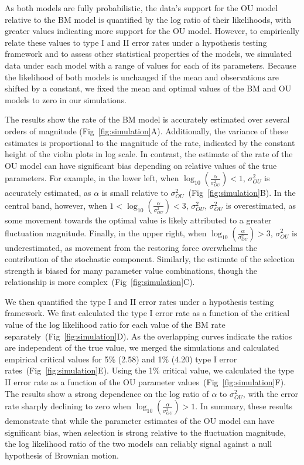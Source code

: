 As both models are fully probabilistic, the data's support for the OU model relative to the BM model is quantified by the log ratio of their likelihoods, with greater values indicating more support for the OU model. However, to empirically relate these values to type I and II error rates under a hypothesis testing framework and to assess other statistical properties of the models, we simulated data under each model with a range of values for each of its parameters. Because the likelihood of both models is unchanged if the mean and observations are shifted by a constant, we fixed the mean and optimal values of the BM and OU models to zero in our simulations.

The results show the rate of the BM model is accurately estimated over several orders of magnitude (Fig~\ref{fig:simulation}A). Additionally, the variance of these estimates is proportional to the magnitude of the rate, indicated by the constant height of the violin plots in log scale. In contrast, the estimate of the rate of the OU model can have significant bias depending on relative values of the true parameters. For example, in the lower left, when $\log_{10}(\frac{\alpha}{\sigma^2_{OU}}) < 1$, $\sigma^2_{OU}$ is accurately estimated, as $\alpha$ is small relative to $\sigma^2_{OU}$~(Fig~\ref{fig:simulation}B). In the central band, however, when $1 < \log_{10}(\frac{\alpha}{\sigma^2_{OU}}) < 3$, $\sigma^2_{OU}$, $\sigma^2_{OU}$ is overestimated, as some movement towards the optimal value is likely attributed to a greater fluctuation magnitude. Finally, in the upper right, when $\log_{10}(\frac{\alpha}{\sigma^2_{OU}}) > 3$, $\sigma^2_{OU}$ is underestimated, as movement from the restoring force overwhelms the contribution of the stochastic component. Similarly, the estimate of the selection strength is biased for many parameter value combinations, though the relationship is more complex~(Fig~\ref{fig:simulation}C).

We then quantified the type I and II error rates under a hypothesis testing framework. We first calculated the type I error rate as a function of the critical value of the log likelihood ratio for each value of the BM rate separately~(Fig~\ref{fig:simulation}D). As the overlapping curves indicate the ratios are independent of the true value, we merged the simulations and calculated empirical critical values for 5\% (2.58) and 1\% (4.20) type I error rates~(Fig~\ref{fig:simulation}E). Using the 1\% critical value, we calculated the type II error rate as a function of the OU parameter values~(Fig~\ref{fig:simulation}F). The results show a strong dependence on the log ratio of $\alpha$ to $\sigma^2_{OU}$, with the error rate sharply declining to zero when $\log_{10}(\frac{\alpha}{\sigma^2_{OU}}) > 1$. In summary, these results demonstrate that while the parameter estimates of the OU model can have significant bias, when selection is strong relative to the fluctuation magnitude, the log likelihood ratio of the two models can reliably signal against a null hypothesis of Brownian motion.

